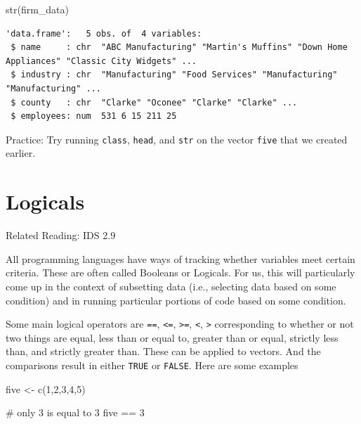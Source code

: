 \documentclass[
  letterpaper,
  DIV=11,
  numbers=noendperiod]{scrreprt}
\newenvironment{Shaded}{\begin{snugshade}}{\end{snugshade}}
\newcommand{\CommentTok}[1]{\textcolor[rgb]{0.37,0.37,0.37}{#1}}
\newcommand{\DecValTok}[1]{\textcolor[rgb]{0.68,0.00,0.00}{#1}}
\newcommand{\FunctionTok}[1]{\textcolor[rgb]{0.28,0.35,0.67}{#1}}
\newcommand{\NormalTok}[1]{\textcolor[rgb]{0.00,0.23,0.31}{#1}}
\newcommand{\OtherTok}[1]{\textcolor[rgb]{0.00,0.23,0.31}{#1}}
\newcommand{\SpecialCharTok}[1]{\textcolor[rgb]{0.37,0.37,0.37}{#1}}
\begin{document}
\begin{Shaded}
\begin{Highlighting}[]
\FunctionTok{str}\NormalTok{(firm\_data)}
\end{Highlighting}
\end{Shaded}

\begin{verbatim}
'data.frame':   5 obs. of  4 variables:
 $ name     : chr  "ABC Manufacturing" "Martin's Muffins" "Down Home Appliances" "Classic City Widgets" ...
 $ industry : chr  "Manufacturing" "Food Services" "Manufacturing" "Manufacturing" ...
 $ county   : chr  "Clarke" "Oconee" "Clarke" "Clarke" ...
 $ employees: num  531 6 15 211 25
\end{verbatim}

{Practice:} Try running \texttt{class}, \texttt{head}, and \texttt{str}
on the vector \texttt{five} that we created earlier.

\section{Logicals}\label{logicals}

Related Reading: IDS 2.9

All programming languages have ways of tracking whether variables meet
certain criteria. These are often called Booleans or Logicals. For us,
this will particularly come up in the context of subsetting data (i.e.,
selecting data based on some condition) and in running particular
portions of code based on some condition.

Some main logical operators are \texttt{==}, \texttt{\textless{}=},
\texttt{\textgreater{}=}, \texttt{\textless{}}, \texttt{\textgreater{}}
corresponding to whether or not two things are equal, less than or equal
to, greater than or equal, strictly less than, and strictly greater
than. These can be applied to vectors. And the comparisons result in
either \texttt{TRUE} or \texttt{FALSE}. Here are some examples

\begin{Shaded}
\begin{Highlighting}[]
\NormalTok{five }\OtherTok{\textless{}{-}} \FunctionTok{c}\NormalTok{(}\DecValTok{1}\NormalTok{,}\DecValTok{2}\NormalTok{,}\DecValTok{3}\NormalTok{,}\DecValTok{4}\NormalTok{,}\DecValTok{5}\NormalTok{)}

\CommentTok{\# only 3 is equal to 3}
\NormalTok{five }\SpecialCharTok{==} \DecValTok{3}
\end{Highlighting}
\end{Shaded}
\end{document}
